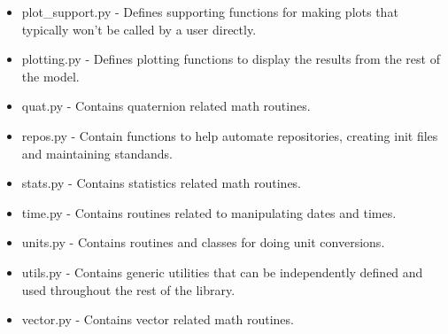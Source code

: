 \documentclass[12pt]{article}
\begin{document}
\begin{itemize}
    \item plot\_support.py - Defines supporting functions for making plots that typically won't be called by a user directly.
    \item plotting.py - Defines plotting functions to display the results from the rest of the model.
    \item quat.py - Contains quaternion related math routines.
    \item repos.py - Contain functions to help automate repositories, creating init files and maintaining standands.
    \item stats.py - Contains statistics related math routines.
    \item time.py - Contains routines related to manipulating dates and times.
    \item units.py - Contains routines and classes for doing unit conversions.
    \item utils.py - Contains generic utilities that can be independently defined and used throughout the rest of the library.
    \item vector.py - Contains vector related math routines.
\end{itemize}
\end{document}
